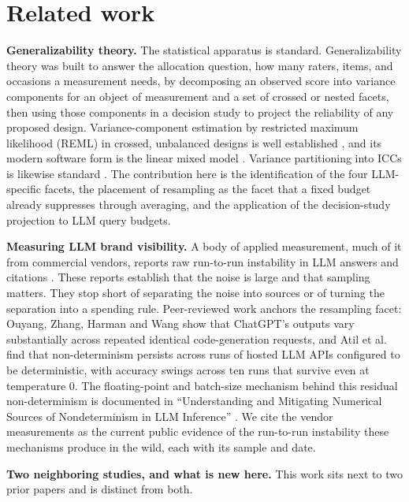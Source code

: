 \documentclass[pdflatex,sn-mathphys-num]{sn-jnl}
\begin{document}
\section{Related work}\label{related-work}

\textbf{Generalizability theory.} The statistical apparatus is standard. Generalizability theory \cite{ref4,ref6,ref16} was built to answer the allocation question, how many raters, items, and occasions a measurement needs, by decomposing an observed score into variance components for an object of measurement and a set of crossed or nested facets, then using those components in a decision study to project the reliability of any proposed design. Variance-component estimation by restricted maximum likelihood (REML) in crossed, unbalanced designs is well established \cite{ref14}, and its modern software form is the linear mixed model \cite{ref3,ref15}. Variance partitioning into ICCs is likewise standard \cite{ref10}. The contribution here is the identification of the four LLM-specific facets, the placement of resampling as the facet that a fixed budget already suppresses through averaging, and the application of the decision-study projection to LLM query budgets.

\textbf{Measuring LLM brand visibility.} A body of applied measurement, much of it from commercial vendors, reports raw run-to-run instability in LLM answers and citations \cite{ref8,ref9,ref12,ref13}. These reports establish that the noise is large and that sampling matters. They stop short of separating the noise into sources or of turning the separation into a spending rule. Peer-reviewed work anchors the resampling facet: Ouyang, Zhang, Harman and Wang \cite{ref11} show that ChatGPT's outputs vary substantially across repeated identical code-generation requests, and Atil et al.~\cite{ref1} find that non-determinism persists across runs of hosted LLM APIs configured to be deterministic, with accuracy swings across ten runs that survive even at temperature 0. The floating-point and batch-size mechanism behind this residual non-determinism is documented in ``Understanding and Mitigating Numerical Sources of Nondeterminism in LLM Inference'' \cite{ref17}. We cite the vendor measurements as the current public evidence of the run-to-run instability these mechanisms produce in the wild, each with its sample and date.

\textbf{Two neighboring studies, and what is new here.} This work sits next to two prior papers and is distinct from both.
\end{document}
